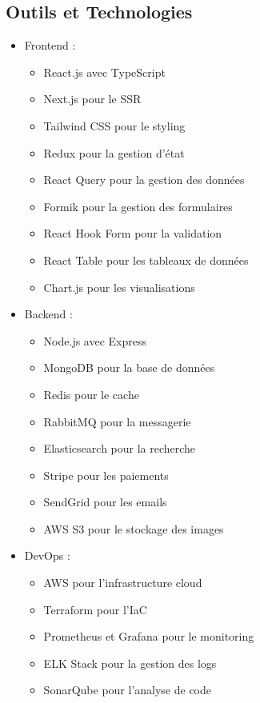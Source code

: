 \subsection{Outils et Technologies}
\begin{itemize}
    \item Frontend :
        \begin{itemize}
            \item React.js avec TypeScript
            \item Next.js pour le SSR
            \item Tailwind CSS pour le styling
            \item Redux pour la gestion d'état
            \item React Query pour la gestion des données
            \item Formik pour la gestion des formulaires
            \item React Hook Form pour la validation
            \item React Table pour les tableaux de données
            \item Chart.js pour les visualisations
        \end{itemize}
    \item Backend :
        \begin{itemize}
            \item Node.js avec Express
            \item MongoDB pour la base de données
            \item Redis pour le cache
            \item RabbitMQ pour la messagerie
            \item Elasticsearch pour la recherche
            \item Stripe pour les paiements
            \item SendGrid pour les emails
            \item AWS S3 pour le stockage des images
        \end{itemize}
    \item DevOps :
        \begin{itemize}
            \item AWS pour l'infrastructure cloud
            \item Terraform pour l'IaC
            \item Prometheus et Grafana pour le monitoring
            \item ELK Stack pour la gestion des logs
            \item SonarQube pour l'analyse de code
        \end{itemize}
\end{itemize}

